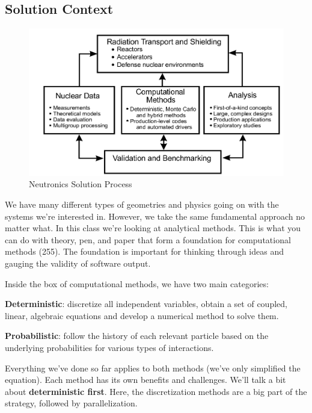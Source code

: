 \documentclass[12pt]{article}
\begin{document}
\vspace{-1 em}
\subsection*{Solution Context}%
\begin{figure}[h!]
    \begin{center}
    \includegraphics[keepaspectratio, width = 4.5 in]{../figs/solver-map}
    \end{center}
    \caption{Neutronics Solution Process}
    \label{fig:context}
\end{figure}
%
We have many different types of geometries and physics going on with the systems we're interested in. However, we take the same fundamental approach no matter what. In this class we're looking at analytical methods. This is what you can do with theory, pen, and paper that form a foundation for computational methods (255). The foundation is important for thinking through ideas and gauging the validity of software output. 

Inside the box of computational methods, we have two main categories: 
\begin{compactitem}
\item \textbf{Deterministic}: discretize all independent variables, obtain a set of coupled, linear, algebraic equations and develop a numerical method to solve them.
\item \textbf{Probabilistic}: follow the history of each relevant particle based on the underlying probabilities for various types of interactions.
\end{compactitem}
%
Everything we've done so far applies to both methods (we've only simplified the equation). Each method has its own benefits and challenges. We'll talk a bit about \textbf{deterministic first}. Here, the discretization methods are a big part of the strategy, followed by parallelization.
\end{document}
